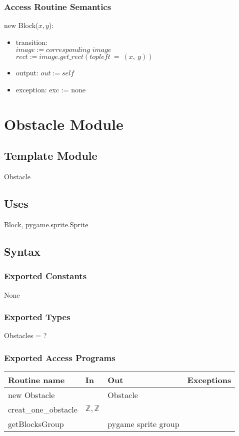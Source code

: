 \documentclass[12pt]{article}
\begin{document}
\subsubsection*{Access Routine Semantics}
\noindent new Block($\mathit{x}, \mathit{y}$):
\begin{itemize}
\item transition:\\
$image := \textit{corresponding image}$\\
 $rect := image.get\_rect(topleft\ =\ (x,\ y))$
\item output: $out := \mathit{self}$
\item exception: exc := none
\end{itemize}
\newpage

\section{Obstacle Module}

\subsection*{Template Module}
Obstacle

\subsection*{Uses}
Block, pygame.sprite.Sprite

\subsection*{Syntax}
\subsubsection*{Exported Constants}
None
\subsubsection*{Exported Types}
Obstacles = ?
\subsubsection*{Exported Access Programs}
\begin{tabular}{| l | l | l | p{5cm} |}
\hline
\textbf{Routine name} & \textbf{In} & \textbf{Out} & \textbf{Exceptions}\\
\hline
new Obstacle & & Obstacle &\\
\hline
creat\_one\_obstacle & $\mathbb{Z}, \mathbb{Z}$   &  & \\
\hline
getBlocksGroup &    & pygame sprite group & \\
\hline
\end{tabular}
\end{document}
